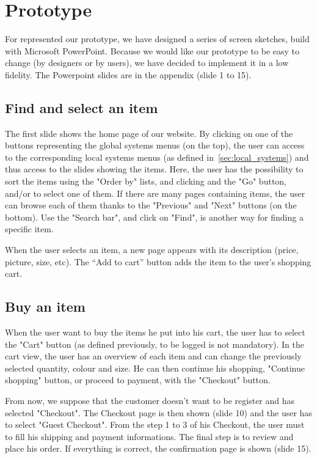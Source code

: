 \section{Prototype}

For represented our prototype, we have designed a series of screen sketches, build with Microsoft PowerPoint. Because we would like our prototype to be easy to change (by designers or by users),
we have decided to implement it in a low fidelity. The Powerpoint slides are in the appendix (slide 1 to 15).

\subsection{Find and select an item}
The first slide shows the home page of our website. By clicking on one of the buttons representing the global systems menus (on the top), the user can access to the corresponding local systems menus (as defined in~\ref{sec:local_systems}) and thus access to the slides showing the items. Here, the user has the possibility to sort the items using the "Order by" lists, and clicking and the "Go" button, and/or to select one of them. If there are many pages containing items, the user can browse each of them thanks to the "Previous" and "Next" buttons (on the bottom). Use the "Search bar", and click on "Find", is another way for finding a specific item.

When the user selects an item, a new page appears with its description (price, picture, size, etc). 
The ``Add to cart'' button adds the item to the user's shopping cart.

\subsection{Buy an item}
When the user want to buy the items he put into his cart, the user has to select the "Cart" button (as defined previously, to be logged is not mandatory). In the cart view, the user has an overview of each item and can change the previously selected quantity, colour and size. He can then continue his shopping, "Continue shopping" button, or proceed to payment, with the "Checkout" button.

From now, we suppose that the customer doesn't want to be register and has selected "Checkout". The Checkout page is then shown (slide 10) and the user has to select "Guest Checkout". From the step 1 to 3 of his Checkout, the user must to fill his shipping and payment informations. The final step is to review and place his order. If everything is correct, the confirmation page is shown (slide 15).
